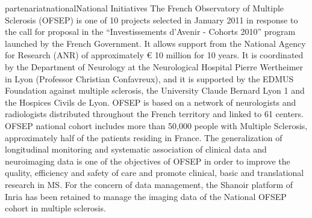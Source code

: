 \documentclass{ra2018}
\begin{document}
\begin{module}{partenariat}{national}{National Initiatives}
        The French Observatory of Multiple Sclerosis (OFSEP) is one of 10 projects
        selected in January 2011 in response to the call for proposal in the
        ``Investissements d’Avenir - Cohorts 2010'' program launched by the French
        Government. It allows support from the National Agency for Research (ANR) of
        approximately € 10 million for 10 years. It is coordinated by the Department of
        Neurology at the Neurological Hospital Pierre Wertheimer in Lyon (Professor
        Christian Confavreux), and it is supported by the EDMUS Foundation against
        multiple sclerosis, the University Claude Bernard Lyon 1 and the Hospices
        Civils de Lyon.  OFSEP is based on a network of neurologists and radiologists
        distributed throughout the French territory and linked to 61 centers. OFSEP
        national cohort includes more than 50,000 people with Multiple Sclerosis,
        approximately half of the patients residing in France. The generalization of
        longitudinal monitoring and systematic association of clinical data and
        neuroimaging data is one of the objectives of OFSEP in order to improve the
        quality, efficiency and safety of care and promote clinical, basic and
        translational research in MS.  For the concern of data management, the Shanoir
        platform of Inria has been retained to manage the imaging data of the National
        OFSEP cohort in multiple sclerosis.
        
        \end{module} 




\end{document}
